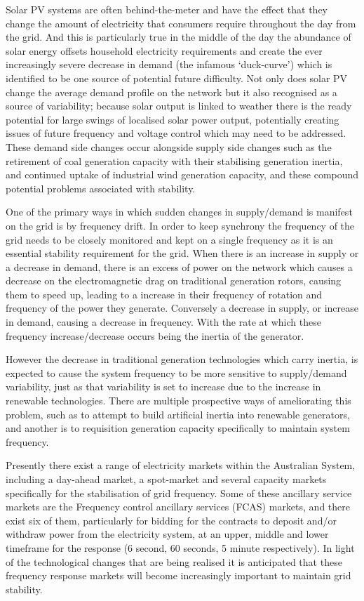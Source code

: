 Solar PV systems are often behind-the-meter and have the effect that they change the amount of electricity that consumers require throughout the day from the grid.
And this is particularly true in the middle of the day the abundance of solar energy offsets household electricity requirements and create the ever increasingly severe decrease in demand (the infamous `duck-curve') which is identified to be one source of potential future difficulty.
Not only does solar PV change the average demand profile on the network but it also recognised as a source of variability; because solar output is linked to weather there is the ready potential for large swings of localised solar power output, potentially creating issues of future frequency and voltage control which may need to be addressed.\cite{australianenergymarketoperatorlimited2018}
These demand side changes occur alongside supply side changes such as the retirement of coal generation capacity with their stabilising generation inertia, and continued uptake of industrial wind generation capacity, and these compound potential problems associated with stability.

One of the primary ways in which sudden changes in supply/demand is manifest on the grid is by frequency drift.
In order to keep synchrony the frequency of the grid needs to be closely monitored and kept on a single frequency as it is an essential stability requirement for the grid.
When there is an increase in supply or a decrease in demand, there is an excess of power on the network which causes a decrease on the electromagnetic drag on traditional generation rotors, causing them to speed up, leading to a increase in their frequency of rotation and frequency of the power they generate.
Conversely a decrease in supply, or increase in demand, causing a decrease in frequency. With the rate at which these frequency increase/decrease occurs being the inertia of the generator.

However the decrease in traditional generation technologies which carry inertia, is expected to cause the system frequency to be more sensitive to supply/demand variability, just as that variability is set to increase due to the increase in renewable technologies.
There are multiple prospective ways of ameliorating this problem, such as to attempt to build artificial inertia into renewable generators, and another is to requisition generation capacity specifically to maintain system frequency.\cite{doi:10.1002/2050-7038.12128}

Presently there exist a range of electricity markets within the Australian System, including a day-ahead market, a spot-market and several capacity markets specifically for the stabilisation of grid frequency.
Some of these ancillary service markets are the Frequency control ancillary services (FCAS) markets, and there exist six of them, particularly for bidding for the contracts to deposit and/or withdraw power from the electricity system, at an upper, middle and lower timeframe for the response (6 second, 60 seconds, 5 minute respectively). \cite{RIESZ201586}
In light of the technological changes that are being realised it is anticipated that these frequency response markets will become increasingly important to maintain grid stability.

